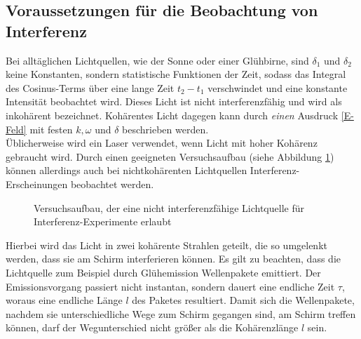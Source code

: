 \subsection*{Voraussetzungen für die Beobachtung von Interferenz}
Bei alltäglichen Lichtquellen, wie der Sonne oder einer Glühbirne, sind $\delta_1$ und $\delta_2$ keine Konstanten, sondern statistische Funktionen der Zeit, sodass das Integral des Cosinus-Terms über eine lange Zeit $t_2-t_1$ verschwindet und eine konstante Intensität beobachtet wird. Dieses Licht ist nicht interferenzfähig und wird als inkohärent bezeichnet. Kohärentes Licht dagegen kann durch \emph{einen} Ausdruck \eqref{E-Feld} mit festen $k, \omega$ und $\delta$ beschrieben werden. \\
Üblicherweise wird ein Laser verwendet, wenn Licht mit hoher Kohärenz gebraucht wird. Durch einen geeigneten Versuchsaufbau (siehe Abbildung \ref{Gluhlampe}) können allerdings auch bei nichtkohärenten Lichtquellen Interferenz-Erscheinungen beobachtet werden.
\begin{figure}[h!]
	\centering
	
	\caption{Versuchsaufbau, der eine nicht interferenzfähige Lichtquelle für Interferenz-Experimente erlaubt}
	\label{Gluhlampe}
\end{figure} 
Hierbei wird das Licht in zwei kohärente Strahlen geteilt, die so umgelenkt werden, dass sie am Schirm interferieren können. Es gilt zu beachten, dass die Lichtquelle zum Beispiel durch Glühemission Wellenpakete emittiert. Der Emissionsvorgang passiert nicht instantan, sondern dauert eine endliche Zeit $\tau$, woraus eine endliche Länge $l$ des Paketes resultiert. Damit sich die Wellenpakete, nachdem sie unterschiedliche Wege zum Schirm gegangen sind, am Schirm treffen können, darf der Wegunterschied nicht größer als die Kohärenzlänge $l$ sein.